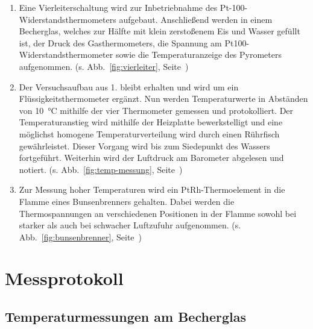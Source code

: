 \documentclass[a4paper,12pt]{article}
\begin{document}
\begin{enumerate}
    \item Eine Vierleiterschaltung wird zur Inbetriebnahme des Pt-100-Widerstandsthermometers aufgebaut. Anschließend werden in einem Becherglas, welches zur Hälfte mit klein zerstoßenem Eis und Wasser gefüllt ist, der Druck des Gasthermometers, die Spannung am Pt100-Widerstandsthermometer sowie die Temperaturanzeige des Pyrometers aufgenommen. 
    (s. Abb.~\ref{fig:vierleiter}, Seite~\pageref{fig:vierleiter})
    \item Der Versuchsaufbau aus 1. bleibt erhalten und wird um ein Flüssigkeitsthermometer ergänzt. Nun werden Temperaturwerte in Abständen von \SI{10}{\celsius} mithilfe der vier Thermometer gemessen und protokolliert. Der Temperaturanstieg wird mithilfe der Heizplatte bewerkstelligt und eine möglichst homogene Temperaturverteilung wird durch einen Rührfisch gewährleistet. Dieser Vorgang wird bis zum Siedepunkt des Wassers fortgef\"uhrt. Weiterhin wird der Luftdruck am Barometer abgelesen und notiert.
    (s. Abb.~\ref{fig:temp-messung}, Seite~\pageref{fig:temp-messung})
    \item Zur Messung hoher Temperaturen wird ein PtRh-Thermoelement in die Flamme eines Bunsenbrenners gehalten. Dabei werden die Thermospannungen an verschiedenen Positionen in der Flamme sowohl bei starker als auch bei schwacher Luftzufuhr aufgenommen.
    (s. Abb.~\ref{fig:bunsenbrenner}, Seite~\pageref{fig:bunsenbrenner})
\end{enumerate}

\section{Messprotokoll}
\subsection{Temperaturmessungen am Becherglas}
\end{document}
